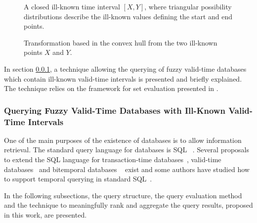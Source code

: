 \begin{figure}
\centering

\caption{A closed ill-known time interval $\left[X, Y\right]$, where triangular possibility distributions describe the ill-known values defining the start and end points.}
\label{fig:interval}
\end{figure}

\begin{figure}
\centering

\caption{Transformation based in the convex hull from the two ill-known points $X$ and $Y$. }
\label{fig:convexhull}
\end{figure}

In section \ref{subsec:querying-time-intervals}, a technique allowing the querying of fuzzy valid-time databases which contain ill-known valid-time intervals is presented and briefly explained. The technique relies on the framework for set evaluation presented in \cite{Pon11}.



\subsubsection{Querying Fuzzy Valid-Time Databases with Ill-Known Valid-Time Intervals}
\label{subsec:querying-time-intervals}

One of the main purposes of the existence of databases is to allow information retrieval. The standard query language for databases is SQL ~\cite{Mel93}. Several proposals to extend the SQL language for transaction-time databases~\cite{Sarda90}, valid-time databases~\cite{gad92} and bitemporal databases ~\cite{TSQL} exist and some authors have studied how to support temporal querying in standard SQL~\cite{Snodgrass98}.

In the following subsections, the query structure, the query evaluation method and the technique to meaningfully rank and aggregate the query results, proposed in this work, are presented. 







